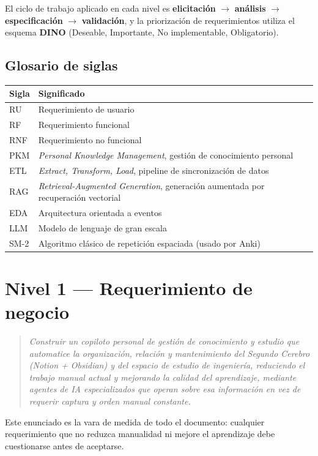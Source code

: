 \documentclass[11pt,a4paper]{article}
\begin{document}
El ciclo de trabajo aplicado en cada nivel es \textbf{elicitación} $\rightarrow$ \textbf{análisis} $\rightarrow$ \textbf{especificación} $\rightarrow$ \textbf{validación}, y la priorización de requerimientos utiliza el esquema \textbf{DINO} (Deseable, Importante, No implementable, Obligatorio).

\subsection*{Glosario de siglas}
\begin{longtable}{@{}p{2.6cm}p{11.5cm}@{}}
\toprule
Sigla & Significado \\
\midrule
\endhead
RU & Requerimiento de usuario \\
RF & Requerimiento funcional \\
RNF & Requerimiento no funcional \\
PKM & \emph{Personal Knowledge Management}, gestión de conocimiento personal \\
ETL & \emph{Extract, Transform, Load}, pipeline de sincronización de datos \\
RAG & \emph{Retrieval-Augmented Generation}, generación aumentada por recuperación vectorial \\
EDA & Arquitectura orientada a eventos \\
LLM & Modelo de lenguaje de gran escala \\
SM-2 & Algoritmo clásico de repetición espaciada (usado por Anki) \\
\bottomrule
\end{longtable}

\section{Nivel 1 --- Requerimiento de negocio}

\begin{quote}
\itshape
Construir un copiloto personal de gestión de conocimiento y estudio que automatice la organización, relación y mantenimiento del Segundo Cerebro (Notion + Obsidian) y del espacio de estudio de ingeniería, reduciendo el trabajo manual actual y mejorando la calidad del aprendizaje, mediante agentes de IA especializados que operan sobre esa información en vez de requerir captura y orden manual constante.
\end{quote}

Este enunciado es la vara de medida de todo el documento: cualquier requerimiento que no reduzca manualidad ni mejore el aprendizaje debe cuestionarse antes de aceptarse.
\end{document}
